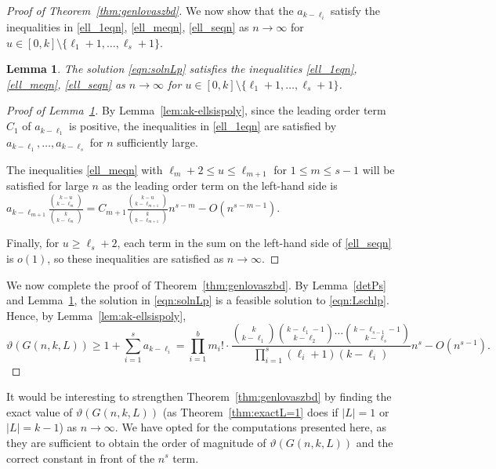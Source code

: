 \documentclass[11pt]{article}
\newtheorem{lemma}[theorem]{Lemma}
\theoremstyle{definition}
\theoremstyle{remark}
\begin{document}
\begin{proof}[Proof of Theorem~\ref{thm:genlovaszbd}]
We now show that the $a_{k-\ell_i}$ satisfy the inequalities in \eqref{ell_1eqn}, \eqref{ell_meqn}, \eqref{ell_seqn} as $n\rightarrow \infty$ for $u\in [0, k] \setminus \{\ell_1 + 1, \ldots, \ell_s+1\}$.

\begin{lemma}\label{lem:otherineqs}
The solution \eqref{eqn:solnLp} satisfies the inequalities \eqref{ell_1eqn}, \eqref{ell_meqn}, \eqref{ell_seqn} as $n\rightarrow \infty$ for $u\in [0, k] \setminus \{\ell_1 + 1, \ldots, \ell_s+1\}$. 
\end{lemma}

\begin{proof}[Proof of Lemma~\ref{lem:otherineqs}]
By Lemma~\ref{lem:ak-ellsispoly}, since the leading order term $C_1$ of $a_{k-\ell_1}$ is positive, the inequalities in \eqref{ell_1eqn} are satisfied by $a_{k-\ell_1}, \ldots, a_{k-\ell_s}$ for $n$ sufficiently large. 

The inequalities \eqref{ell_meqn} with $\ell_m+2 \le u\le \ell_{m+1}$ for $1\le m \le s-1$ will be satisfied for large $n$ as the leading order term on the left-hand side is $a_{k-\ell_{m+1}}\frac{\binom{k-u}{k-\ell_m}}{\binom{k}{k-\ell_m}} = C_{m+1}\frac{\binom{k-u}{k-\ell_{m+1}}}{\binom{k}{k-\ell_{m+1}}}n^{s-m} - O(n^{s-m-1})$. 

Finally, for $u\ge \ell_s + 2$, each term in the sum on the left-hand side of \eqref{ell_seqn} is $o(1)$, so these inequalities are satisfied as $n\rightarrow \infty$.
\end{proof}

We now complete the proof of Theorem~\ref{thm:genlovaszbd}. By Lemma~\ref{detPs} and Lemma~\ref{lem:otherineqs}, the solution in \eqref{eqn:solnLp} is a feasible solution to \eqref{eqn:Lschlp}. Hence, by Lemma~\ref{lem:ak-ellsispoly},
\[\vartheta(G(n, k, L)) \ge 1 + \sum_{i=1}^sa_{k-\ell_i} = \prod_{i=1}^{b}m_i!\cdot\frac{\binom{k}{k-\ell_1}\binom{k-\ell_1-1}{k-\ell_2}\cdots \binom{k-\ell_{s-1}-1}{k-\ell_s}}{\prod_{i=1}^s(\ell_i+1)(k-\ell_i)}n^s - O(n^{s-1}).\]
\end{proof}

It would be interesting to strengthen Theorem~\ref{thm:genlovaszbd} by finding the exact value of $\vartheta(G(n, k, L))$ (as Theorem~\ref{thm:exactL=1} does if $|L|=1$ or $|L| = k-1$) as $n\rightarrow\infty$. We have opted for the  computations presented here, as they are sufficient to obtain the order of magnitude of $\vartheta(G(n, k, L))$ and the correct constant in front of the $n^{s}$ term. 
\end{document}
